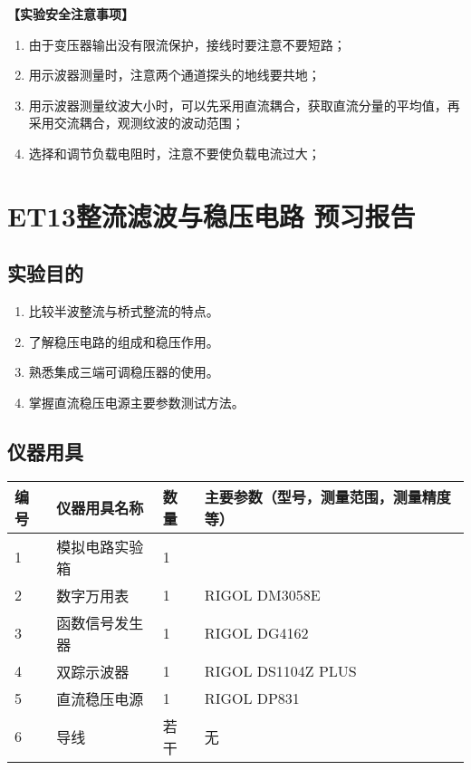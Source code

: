 \documentclass[dvipsnames, svgnames,a4paper,11pt]{article}
\begin{document}
	\textbf{【实验安全注意事项】}	
	\begin{enumerate}
		\item 由于变压器输出没有限流保护，接线时要注意不要短路；
		\item 用示波器测量时，注意两个通道探头的地线要共地；
		\item 用示波器测量纹波大小时，可以先采用直流耦合，获取直流分量的平均值，再采用交流耦合，观测纹波的波动范围；
		\item 选择和调节负载电阻时，注意不要使负载电流过大；
		
	\end{enumerate}
	
	\clearpage
	\tableofcontents
	\clearpage
	
	
	
	
	\setcounter{section}{0}
	\section{ET13整流滤波与稳压电路 \quad\heiti 预习报告}
	
	\subsection{实验目的}
	\begin{enumerate}
		\item 比较半波整流与桥式整流的特点。
		\item 了解稳压电路的组成和稳压作用。
		\item 熟悉集成三端可调稳压器的使用。
		\item 掌握直流稳压电源主要参数测试方法。
	\end{enumerate}
	
	\subsection{仪器用具}
	\begin{table}[htbp]
		\centering
		\renewcommand\arraystretch{1.6}
		\begin{tabular}{p{}|p{}|p{}|p{}}
			\hline
			编号 & 仪器用具名称 & 数量 & 主要参数（型号，测量范围，测量精度等） \\
\hline
1 & 模拟电路实验箱 & 1 &  \\
2 & 数字万用表 & 1 & RIGOL DM3058E \\
3 & 函数信号发生器 & 1 & RIGOL DG4162 \\
4 & 双踪示波器 & 1 & RIGOL DS1104Z PLUS \\
5 & 直流稳压电源 & 1 & RIGOL DP831 \\
6 & 导线 & 若干 & 无 \\
			\hline
		\end{tabular}
	\end{table}
	
\end{document}
